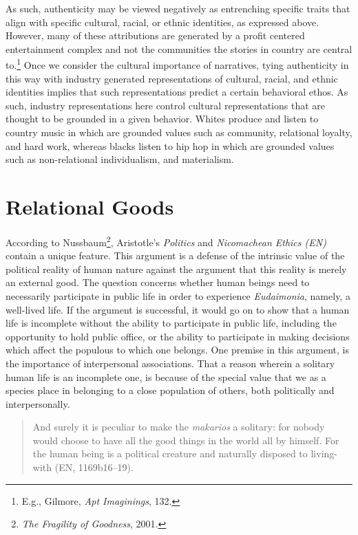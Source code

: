 \documentclass[phdthesis,12pt,final,a4paper]{wuthesis}
\theoremstyle{definition}
\theoremstyle{definition}
\theoremstyle{definition}
\theoremstyle{definition}
\theoremstyle{remark}
\begin{document}
As such, authenticity may be viewed negatively as entrenching specific traits that align with specific cultural, racial, or ethnic identities, as expressed above. However, many of these attributions are generated by a profit centered entertainment complex and not the communities the stories in country are central to.\footnote{E.g., Gilmore, \emph{Apt {Imaginings}}, 132.} Once we consider the cultural importance of narratives, tying authenticity in this way with industry generated representations of cultural, racial, and ethnic identities implies that such representations predict a certain behavioral ethos. As such, industry representations here control cultural representations that are thought to be grounded in a given behavior. Whites produce and listen to country music in which are grounded values such as community, relational loyalty, and hard work, whereas blacks listen to hip hop in which are grounded values such as non-relational individualism, and materialism.

\section{Relational Goods}\label{relational-goods}

According to Nussbaum\footnote{\emph{The {Fragility} of {Goodness}}, 2001.}, Aristotle's \emph{Politics} and \emph{Nicomachean Ethics (EN)} contain a unique feature. This argument is a defense of the intrinsic value of the political reality of human nature against the argument that this reality is merely an external good. The question concerns whether human beings need to necessarily participate in public life in order to experience \emph{Eudaimonia}, namely, a well-lived life. If the argument is successful, it would go on to show that a human life is incomplete without the ability to participate in public life, including the opportunity to hold public office, or the ability to participate in making decisions which affect the populous to which one belongs. One premise in this argument, is the importance of interpersonal associations. That a reason wherein a solitary human life is an incomplete one, is because of the special value that we as a species place in belonging to a close population of others, both politically and interpersonally.

\begin{quote}
And surely it is peculiar to make the \emph{makarios} a solitary: for nobody would choose to have all the good things in the world all by himself. For the human being is a political creature and naturally disposed to living-with (EN, 1169b16--19).
\end{quote}
\end{document}
